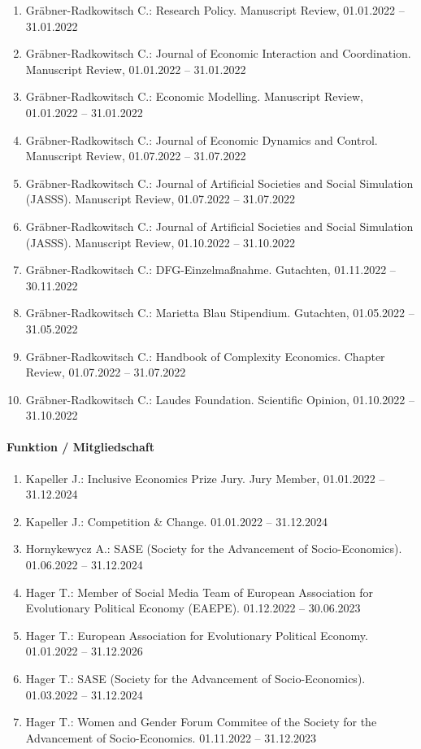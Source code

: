 \begin{enumerate}[leftmargin=*, labelsep=0.5cm]
\item Gräbner-Radkowitsch C.: Research Policy. Manuscript Review, 01.01.2022 -- 31.01.2022
\item Gräbner-Radkowitsch C.: Journal of Economic Interaction and Coordination. Manuscript Review, 01.01.2022 -- 31.01.2022
\item Gräbner-Radkowitsch C.: Economic Modelling. Manuscript Review, 01.01.2022 -- 31.01.2022
\item Gräbner-Radkowitsch C.: Journal of Economic Dynamics and Control. Manuscript Review, 01.07.2022 -- 31.07.2022
\item Gräbner-Radkowitsch C.: Journal of Artificial Societies and Social Simulation (JASSS). Manuscript Review, 01.07.2022 -- 31.07.2022
\item Gräbner-Radkowitsch C.: Journal of Artificial Societies and Social Simulation (JASSS). Manuscript Review, 01.10.2022 -- 31.10.2022
\item Gräbner-Radkowitsch C.: DFG-Einzelmaßnahme. Gutachten, 01.11.2022 -- 30.11.2022
\item Gräbner-Radkowitsch C.: Marietta Blau Stipendium. Gutachten, 01.05.2022 -- 31.05.2022
\item Gräbner-Radkowitsch C.: Handbook of Complexity Economics. Chapter Review, 01.07.2022 -- 31.07.2022
\item Gräbner-Radkowitsch C.: Laudes Foundation. Scientific Opinion, 01.10.2022 -- 31.10.2022
\end{enumerate}

\paragraph{Funktion / Mitgliedschaft}
\begin{enumerate}[leftmargin=*, labelsep=0.5cm]
\item Kapeller J.: Inclusive Economics Prize Jury. Jury Member, 01.01.2022 -- 31.12.2024
\item Kapeller J.: Competition \& Change. 01.01.2022 -- 31.12.2024
\item Hornykewycz A.: SASE (Society for the Advancement of Socio-Economics). 01.06.2022 -- 31.12.2024
\item Hager T.: Member of Social Media Team of European Association for Evolutionary Political Economy (EAEPE). 01.12.2022 -- 30.06.2023
\item Hager T.: European Association for Evolutionary Political Economy. 01.01.2022 -- 31.12.2026
\item Hager T.: SASE (Society for the Advancement of Socio-Economics). 01.03.2022 -- 31.12.2024
\item Hager T.: Women and Gender Forum Commitee of the Society for the Advancement of Socio-Economics. 01.11.2022 -- 31.12.2023
\end{enumerate}
